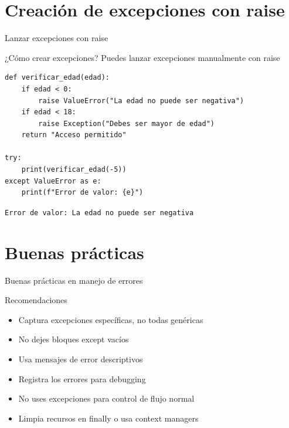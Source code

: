 \documentclass{beamer}
\begin{document}
\section{Creación de excepciones con raise}

\begin{frame}[fragile]{Lanzar excepciones con raise \faRocket}
\begin{conceptbox}{¿Cómo crear excepciones?}
Puedes lanzar excepciones manualmente con raise
\end{conceptbox}

\begin{lstlisting}
def verificar_edad(edad):
    if edad < 0:
        raise ValueError("La edad no puede ser negativa")
    if edad < 18:
        raise Exception("Debes ser mayor de edad")
    return "Acceso permitido"

try:
    print(verificar_edad(-5))
except ValueError as e:
    print(f"Error de valor: {e}")
\end{lstlisting}

\vspace{-0.2cm}
\begin{tcolorbox}[colback=red!10,colframe=red,title={\small\faArrowCircleRight \ Salida},coltitle=fg0,left=3pt,right=3pt,top=2pt,bottom=2pt,boxsep=1pt]
\small\texttt{Error de valor: La edad no puede ser negativa}
\end{tcolorbox}
\end{frame}

\section{Buenas prácticas}

\begin{frame}{Buenas prácticas en manejo de errores \faCheckDouble}
\begin{conceptbox}{Recomendaciones}
\small
\begin{itemize}
    \item[\faCheck] Captura excepciones específicas, no todas genéricas
    \item[\faCheck] No dejes bloques except vacíos
    \item[\faCheck] Usa mensajes de error descriptivos
    \item[\faCheck] Registra los errores para debugging
    \item[\faCheck] No uses excepciones para control de flujo normal
    \item[\faCheck] Limpia recursos en finally o usa context managers
\end{itemize}
\end{conceptbox}
\end{frame}
\end{document}
